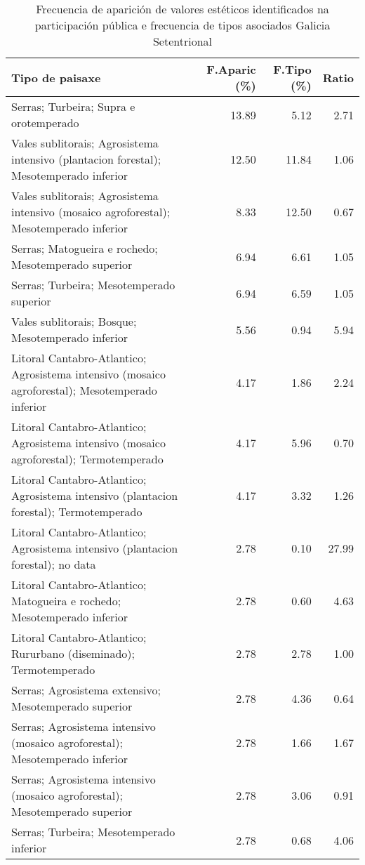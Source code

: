 \begin{table}[p]
\centering
\caption{Frecuencia de aparición de valores estéticos identificados na participación pública e frecuencia de tipos asociados Galicia Setentrional} 
\label{vsixotest10}
\begin{tabular}{lrrr}
  \hline
Tipo de paisaxe & F.Aparic (\%) & F.Tipo (\%) & Ratio \\ 
  \hline
Serras; Turbeira; Supra e orotemperado & 13.89 & 5.12 & 2.71 \\ 
  Vales sublitorais; Agrosistema intensivo (plantacion forestal); Mesotemperado inferior & 12.50 & 11.84 & 1.06 \\ 
  Vales sublitorais; Agrosistema intensivo (mosaico agroforestal); Mesotemperado inferior & 8.33 & 12.50 & 0.67 \\ 
  Serras; Matogueira e rochedo; Mesotemperado superior & 6.94 & 6.61 & 1.05 \\ 
  Serras; Turbeira; Mesotemperado superior & 6.94 & 6.59 & 1.05 \\ 
  Vales sublitorais; Bosque; Mesotemperado inferior & 5.56 & 0.94 & 5.94 \\ 
  Litoral Cantabro-Atlantico; Agrosistema intensivo (mosaico agroforestal); Mesotemperado inferior & 4.17 & 1.86 & 2.24 \\ 
  Litoral Cantabro-Atlantico; Agrosistema intensivo (mosaico agroforestal); Termotemperado & 4.17 & 5.96 & 0.70 \\ 
  Litoral Cantabro-Atlantico; Agrosistema intensivo (plantacion forestal); Termotemperado & 4.17 & 3.32 & 1.26 \\ 
  Litoral Cantabro-Atlantico; Agrosistema intensivo (plantacion forestal); no data & 2.78 & 0.10 & 27.99 \\ 
  Litoral Cantabro-Atlantico; Matogueira e rochedo; Mesotemperado inferior & 2.78 & 0.60 & 4.63 \\ 
  Litoral Cantabro-Atlantico; Rururbano (diseminado); Termotemperado & 2.78 & 2.78 & 1.00 \\ 
  Serras; Agrosistema extensivo; Mesotemperado superior & 2.78 & 4.36 & 0.64 \\ 
  Serras; Agrosistema intensivo (mosaico agroforestal); Mesotemperado inferior & 2.78 & 1.66 & 1.67 \\ 
  Serras; Agrosistema intensivo (mosaico agroforestal); Mesotemperado superior & 2.78 & 3.06 & 0.91 \\ 
  Serras; Turbeira; Mesotemperado inferior & 2.78 & 0.68 & 4.06 \\ 

\end{tabular}
\end{table}
